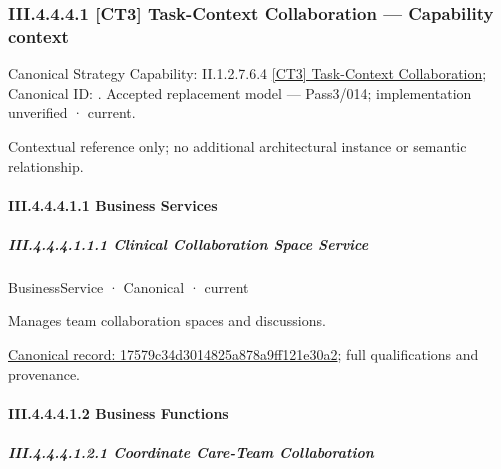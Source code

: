 \subsubsection*{III.4.4.4.1 [CT3] Task-Context Collaboration — Capability context}
\label{navigation:III.4.4.4.1}

{\small Canonical Strategy Capability: II.1.2.7.6.4 \hyperref[element:0ce2d4475d9e4fee8296f9101a6aa2af]{[CT3] Task-Context Collaboration}; Canonical ID: \texttt{}. Accepted replacement model — Pass3/014; implementation unverified · current.}\par
Contextual reference only; no additional architectural instance or semantic relationship.\par
\paragraph*{III.4.4.4.1.1 Business Services}
\label{navigation:III.4.4.4.1.1}

\subparagraph*{III.4.4.4.1.1.1 Clinical Collaboration Space Service}
\label{navigation:III.4.4.4.1.1.1}

\label{element:17579c34d3014825a878a9ff121e30a2}
{\small BusinessService · Canonical · current}\par

Manages team collaboration spaces and discussions.


{\footnotesize \href{../../../../continuum/business/business-service/17579c34d3014825a878a9ff121e30a2.md}{Canonical record: 17579c34d3014825a878a9ff121e30a2}; full qualifications and provenance.}\par
\paragraph*{III.4.4.4.1.2 Business Functions}
\label{navigation:III.4.4.4.1.2}

\subparagraph*{III.4.4.4.1.2.1 Coordinate Care-Team Collaboration}
\label{navigation:III.4.4.4.1.2.1}

